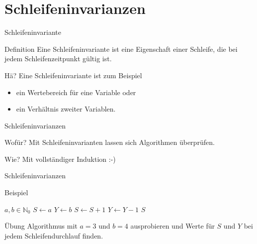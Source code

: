 \section{Schleifeninvarianzen}

\begin{frame}{Schleifeninvariante}
    \begin{block}{Definition}
        Eine Schleifeninvariante ist eine Eigenschaft einer Schleife, die bei jedem Schleifenzeitpunkt gültig ist.
    \end{block}
    \pause
    \begin{block}{Hä?}
        Eine Schleifeninvariante ist zum Beispiel
        \begin{itemize}
            \item ein Wertebereich für eine Variable oder
            \item ein Verhältnis zweiter Variablen.
        \end{itemize}
    \end{block}
\end{frame}
\begin{frame}{Schleifeninvarianzen}
    \begin{block}{Wofür?}
        Mit Schleifeninvarianten lassen sich Algorithmen überprüfen.
    \end{block}
    \pause
    \begin{block}{Wie?}
        Mit vollständiger Induktion :-)
    \end{block}
\end{frame}
\begin{frame}{Schleifeninvarianzen}
    \begin{exampleblock}{Beispiel}
        \begin{algorithm}
            \begin{algorithmic}
                \Require $a, b \in \mathbb{N}_0$
                \State $S \gets a$
                \State $Y \gets b$
                    \State $ S \gets S + 1$
                    \State $Y \gets Y -1$
                \EndFor
                \Ensure $S$
            \end{algorithmic}
        \end{algorithm}
    \end{exampleblock}
    \pause
    \begin{exampleblock}{Übung}
        Algorithmus mit $a = 3$ und $b = 4$ ausprobieren und Werte für $S$ und $Y$ bei jedem Schleifendurchlauf finden.
    \end{exampleblock}
\end{frame}

